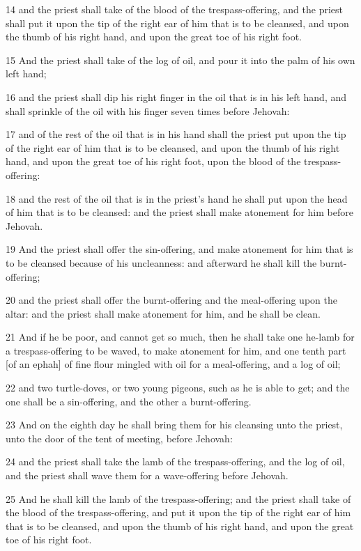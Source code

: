 \par 14 and the priest shall take of the blood of the trespass-offering, and the priest shall put it upon the tip of the right ear of him that is to be cleansed, and upon the thumb of his right hand, and upon the great toe of his right foot.
\par 15 And the priest shall take of the log of oil, and pour it into the palm of his own left hand;
\par 16 and the priest shall dip his right finger in the oil that is in his left hand, and shall sprinkle of the oil with his finger seven times before Jehovah:
\par 17 and of the rest of the oil that is in his hand shall the priest put upon the tip of the right ear of him that is to be cleansed, and upon the thumb of his right hand, and upon the great toe of his right foot, upon the blood of the trespass-offering:
\par 18 and the rest of the oil that is in the priest's hand he shall put upon the head of him that is to be cleansed: and the priest shall make atonement for him before Jehovah.
\par 19 And the priest shall offer the sin-offering, and make atonement for him that is to be cleansed because of his uncleanness: and afterward he shall kill the burnt-offering;
\par 20 and the priest shall offer the burnt-offering and the meal-offering upon the altar: and the priest shall make atonement for him, and he shall be clean.
\par 21 And if he be poor, and cannot get so much, then he shall take one he-lamb for a trespass-offering to be waved, to make atonement for him, and one tenth part [of an ephah] of fine flour mingled with oil for a meal-offering, and a log of oil;
\par 22 and two turtle-doves, or two young pigeons, such as he is able to get; and the one shall be a sin-offering, and the other a burnt-offering.
\par 23 And on the eighth day he shall bring them for his cleansing unto the priest, unto the door of the tent of meeting, before Jehovah:
\par 24 and the priest shall take the lamb of the trespass-offering, and the log of oil, and the priest shall wave them for a wave-offering before Jehovah.
\par 25 And he shall kill the lamb of the trespass-offering; and the priest shall take of the blood of the trespass-offering, and put it upon the tip of the right ear of him that is to be cleansed, and upon the thumb of his right hand, and upon the great toe of his right foot.
